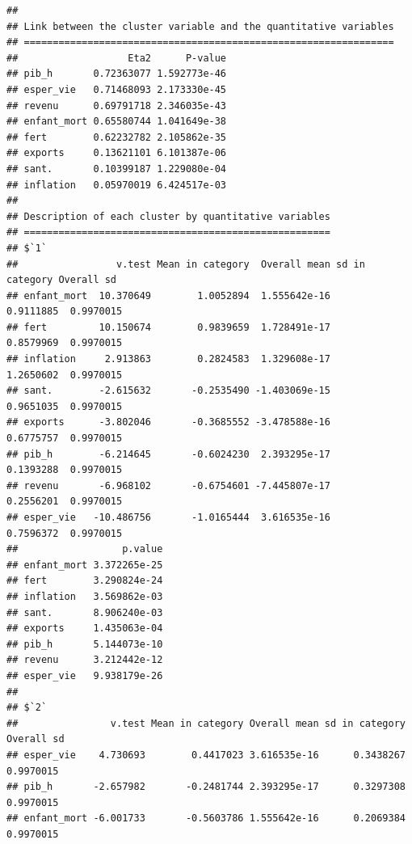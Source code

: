 \documentclass[
]{article}
\newenvironment{Shaded}{}{}
\newcommand{\AttributeTok}[1]{#1}
\newcommand{\DecValTok}[1]{#1}
\newcommand{\FunctionTok}[1]{#1}
\newcommand{\NormalTok}[1]{#1}
\newcommand{\OtherTok}[1]{\textcolor[rgb]{1.00,0.25,0.00}{#1}}
\newcommand{\SpecialCharTok}[1]{\textcolor[rgb]{0.00,0.50,0.50}{#1}}
\begin{document}
\begin{Shaded}
\end{Shaded}

\begin{verbatim}
## 
## Link between the cluster variable and the quantitative variables
## ================================================================
##                   Eta2      P-value
## pib_h       0.72363077 1.592773e-46
## esper_vie   0.71468093 2.173330e-45
## revenu      0.69791718 2.346035e-43
## enfant_mort 0.65580744 1.041649e-38
## fert        0.62232782 2.105862e-35
## exports     0.13621101 6.101387e-06
## sant.       0.10399187 1.229080e-04
## inflation   0.05970019 6.424517e-03
## 
## Description of each cluster by quantitative variables
## =====================================================
## $`1`
##                 v.test Mean in category  Overall mean sd in category Overall sd
## enfant_mort  10.370649        1.0052894  1.555642e-16      0.9111885  0.9970015
## fert         10.150674        0.9839659  1.728491e-17      0.8579969  0.9970015
## inflation     2.913863        0.2824583  1.329608e-17      1.2650602  0.9970015
## sant.        -2.615632       -0.2535490 -1.403069e-15      0.9651035  0.9970015
## exports      -3.802046       -0.3685552 -3.478588e-16      0.6775757  0.9970015
## pib_h        -6.214645       -0.6024230  2.393295e-17      0.1393288  0.9970015
## revenu       -6.968102       -0.6754601 -7.445807e-17      0.2556201  0.9970015
## esper_vie   -10.486756       -1.0165444  3.616535e-16      0.7596372  0.9970015
##                  p.value
## enfant_mort 3.372265e-25
## fert        3.290824e-24
## inflation   3.569862e-03
## sant.       8.906240e-03
## exports     1.435063e-04
## pib_h       5.144073e-10
## revenu      3.212442e-12
## esper_vie   9.938179e-26
## 
## $`2`
##                v.test Mean in category Overall mean sd in category Overall sd
## esper_vie    4.730693        0.4417023 3.616535e-16      0.3438267  0.9970015
## pib_h       -2.657982       -0.2481744 2.393295e-17      0.3297308  0.9970015
## enfant_mort -6.001733       -0.5603786 1.555642e-16      0.2069384  0.9970015

\end{verbatim}
\end{document}

